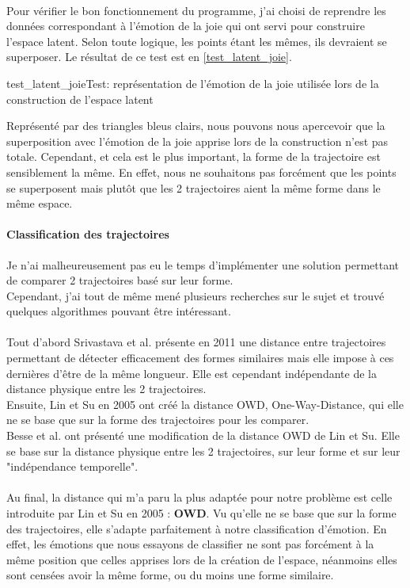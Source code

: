 \documentclass[poster]{polytech/polytech}
\begin{document}
\\
Pour vérifier le bon fonctionnement du programme, j'ai choisi de reprendre les données correspondant à l'émotion de la joie qui ont servi pour construire l'espace latent. Selon toute logique, les points étant les mêmes, ils devraient se superposer. Le résultat de ce test est en \autoref{test_latent_joie}.\\
\begin{Figure}{test_latent_joie}{Test: représentation de l'émotion de la joie utilisée lors de la construction de l'espace latent}
\end{Figure}
Représenté par des triangles bleus clairs, nous pouvons nous apercevoir que la superposition avec l'émotion de la joie apprise lors de la construction n'est pas totale. Cependant, et cela est le plus important, la forme de la trajectoire est sensiblement la même. En effet, nous ne souhaitons pas forcément que les points se superposent mais plutôt que les 2 trajectoires aient la même forme dans le même espace.

\paragraph{Classification des trajectoires}
Je n'ai malheureusement pas eu le temps d'implémenter une solution permettant de comparer 2 trajectoires basé sur leur forme.\\
Cependant, j'ai tout de même mené plusieurs recherches sur le sujet et trouvé quelques algorithmes pouvant être intéressant.\\
\\
Tout d'abord Srivastava et al. présente en 2011 \cite{srivastava2011} une distance entre trajectoires permettant de détecter efficacement des formes similaires mais elle impose à ces dernières d'être de la même longueur. Elle est cependant indépendante de la distance physique entre les 2 trajectoires.\\
Ensuite, Lin et Su en 2005 \cite{linsu2005} ont créé la distance OWD, One-Way-Distance, qui elle ne se base que sur la forme des trajectoires pour les comparer.\\
Besse et al. \cite{besse} ont présenté une modification de la distance OWD de Lin et Su. Elle se base sur la distance physique entre les 2 trajectoires, sur leur forme et sur leur "indépendance temporelle".\\
\\
Au final, la distance qui m'a paru la plus adaptée pour notre problème est celle introduite par Lin et Su en 2005 : \textbf{OWD}. Vu qu'elle ne se base que sur la forme des trajectoires, elle s'adapte parfaitement à notre classification d'émotion. En effet, les émotions que nous essayons de classifier ne sont pas forcément à la même position que celles apprises lors de la création de l'espace, néanmoins elles sont censées avoir la même forme, ou du moins une forme similaire.
\end{document}
